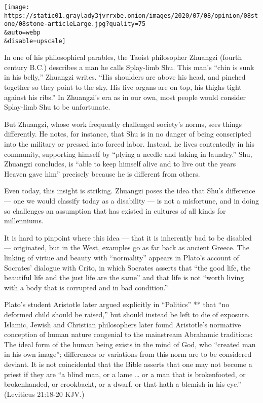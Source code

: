 \texttt{[image: https://static01.graylady3jvrrxbe.onion/images/2020/07/08/opinion/08stone/08stone-articleLarge.jpg?quality=75\\\&auto=webp\\\&disable=upscale]}

In one of his philosophical parables, the Taoist philosopher Zhuangzi
(fourth century B.C.) describes a man he calls Splay-limb Shu. This
man's ``chin is sunk in his belly,'' Zhuangzi writes. ``His shoulders
are above his head, and pinched together so they point to the sky. His
five organs are on top, his thighs tight against his ribs.'' In
Zhuangzi's era as in our own, most people would consider Splay-limb Shu
to be unfortunate.

But Zhuangzi, whose work frequently challenged society's norms, sees
things differently. He notes, for instance, that Shu is in no danger of
being conscripted into the military or pressed into forced labor.
Instead, he lives contentedly in his community, supporting himself by
``plying a needle and taking in laundry.'' Shu, Zhuangzi concludes, is
``able to keep himself alive and to live out the years Heaven gave him''
precisely because he is different from others.

Even today, this insight is striking. Zhuangzi poses the idea that Shu's
difference --- one we would classify today as a disability --- is not a
misfortune, and in doing so challenges an assumption that has existed in
cultures of all kinds for millenniums.

It is hard to pinpoint where this idea --- that it is inherently bad to
be disabled --- originated, but in the West, examples go as far back as
ancient Greece. The linking of virtue and beauty with ``normality''
appears in Plato's account of Socrates' dialogue with Crito, in which
Socrates asserts that ``the good life, the beautiful life and the just
life are the same'' and that life is not ``worth living with a body that
is corrupted and in bad condition.''

Plato's student Aristotle later argued explicitly in ``Politics'' **
that ``no deformed child should be raised,'' but should instead be left
to die of exposure. Islamic, Jewish and Christian philosophers later
found Aristotle's normative conception of human nature congenial to the
mainstream Abrahamic traditions: The ideal form of the human being
exists in the mind of God, who ``created man in his own image'';
differences or variations from this norm are to be considered deviant.
It is not coincidental that the Bible asserts that one may not become a
priest if they are ``a blind man, or a lame \ldots{} or a man that is
brokenfooted, or brokenhanded, or crookbackt, or a dwarf, or that hath a
blemish in his eye.'' (Leviticus 21:18-20 KJV.)

